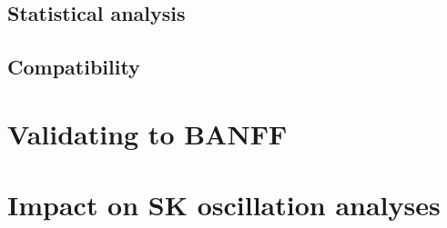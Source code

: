 \subsection{Statistical analysis}

\subsection{Compatibility}

\section{Validating to BANFF}

\section{Impact on SK oscillation analyses}
